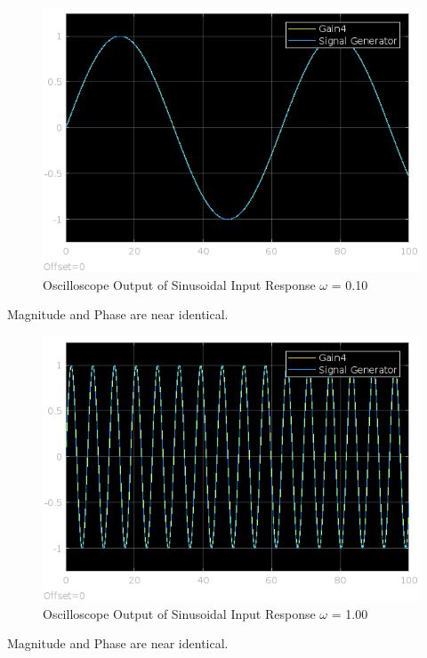 \documentclass[12pt]{article}
\begin{document}
			\begin{figure}[H]
				\centering
				\includegraphics[width=1\linewidth]{"Code/Fig/sine_input_output_w_0_1.png"} 
				\caption{Oscilloscope Output of Sinusoidal Input Response $\omega$ = 0.10}
				\label{fig:slx_sine_input_output_w_0_10}
			\end{figure}	
			Magnitude and Phase are near identical.
			\begin{figure}[H]
				\centering
				\includegraphics[width=1\linewidth]{"Code/Fig/sine_input_output_w_1.png"} 
				\caption{Oscilloscope Output of Sinusoidal Input Response $\omega$ = 1.00}
				\label{fig:slx_sine_input_output_w_1}
			\end{figure}
			Magnitude and Phase are near identical.
\end{document}
